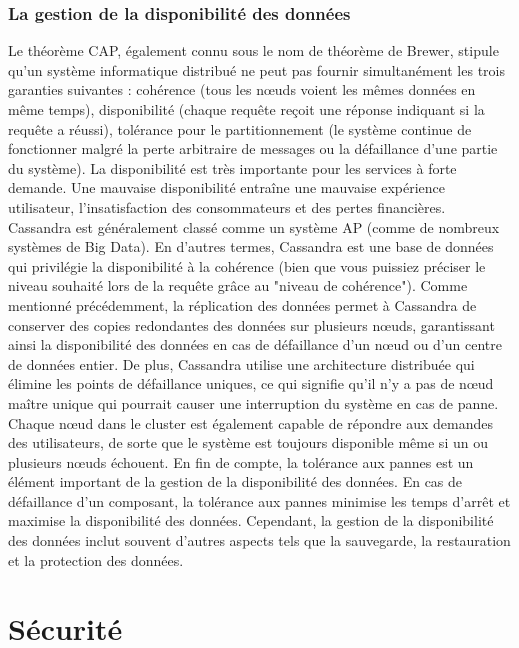 \documentclass[12pt, letterpaper]{report}
\begin{document}
\subsection{La gestion de la disponibilité des données}
Le théorème CAP, également connu sous le nom de théorème de Brewer, stipule qu'un système informatique distribué ne peut pas fournir simultanément les trois garanties suivantes : cohérence (tous les nœuds voient les mêmes données en même temps), disponibilité (chaque requête reçoit une réponse indiquant si la requête a réussi), tolérance pour le partitionnement (le système continue de fonctionner malgré la perte arbitraire de messages ou la défaillance d'une partie du système). 
\newline
La disponibilité est très importante pour les services à forte demande. Une mauvaise disponibilité entraîne une mauvaise expérience utilisateur, l'insatisfaction des consommateurs et des pertes financières. 
\newline
Cassandra est généralement classé comme un système AP (comme de nombreux systèmes de Big Data). En d'autres termes, Cassandra est une base de données qui privilégie la disponibilité à la cohérence (bien que vous puissiez préciser le niveau souhaité lors de la requête grâce au "niveau de cohérence"). 
\newline
Comme mentionné précédemment, la réplication des données permet à Cassandra de conserver des copies redondantes des données sur plusieurs nœuds, garantissant ainsi la disponibilité des données en cas de défaillance d'un nœud ou d'un centre de données entier. De plus, Cassandra utilise une architecture distribuée qui élimine les points de défaillance uniques, ce qui signifie qu'il n'y a pas de nœud maître unique qui pourrait causer une interruption du système en cas de panne. Chaque nœud dans le cluster est également capable de répondre aux demandes des utilisateurs, de sorte que le système est toujours disponible même si un ou plusieurs nœuds échouent. 
\newline
En fin de compte, la tolérance aux pannes est un élément important de la gestion de la disponibilité des données. En cas de défaillance d'un composant, la tolérance aux pannes minimise les temps d'arrêt et maximise  la disponibilité des données. Cependant, la gestion de la disponibilité des données inclut souvent d'autres aspects tels que la sauvegarde, la restauration et la protection des données.

\chapter{Sécurité}
\end{document}
